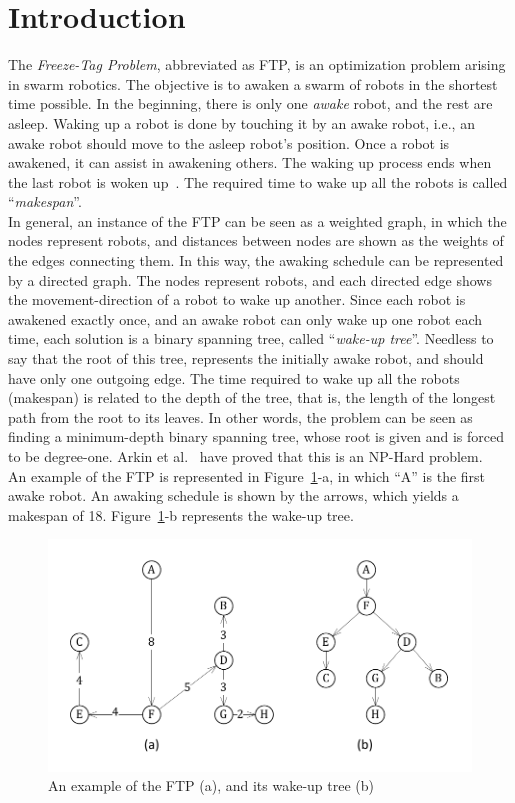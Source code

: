 \documentclass[review]{elsarticle}
\begin{document}
\section{Introduction}
The \textit{Freeze-Tag Problem}, abbreviated as FTP, is an optimization problem arising in swarm robotics. The objective is to awaken a swarm of robots in the shortest time possible. In the beginning, there is only one \textit{awake} robot, and the rest are asleep. Waking up a robot is done by touching it by an awake robot, i.e., an awake robot should move to the asleep robot's position. Once a robot is awakened, it can assist in awakening others. The waking up process ends when the last robot is woken up~\cite{Arkin2006}. The required time to wake up all the robots is called ``\textit{makespan}''.\\
In general, an instance of the FTP can be seen as a weighted graph, in which the nodes represent robots, and distances between nodes are shown as the weights of the edges connecting them. In this way, the awaking schedule can be represented by a directed graph. The nodes represent robots, and each directed edge shows the movement-direction of a robot to wake up another. Since each robot is awakened exactly once, and an awake robot can only wake up one robot each time, each solution is a binary spanning tree, called ``\textit{wake-up tree}''. Needless to say that the root of this tree, represents the initially awake robot, and should have only one outgoing edge. The time required to wake up all the robots (makespan) is related to the depth of the tree, that is, the length of the longest path from the root to its leaves. In other words, the problem can be seen as finding a minimum-depth binary spanning tree, whose root is given and is forced to be degree-one. Arkin et al.~\cite{Arkin2006} have proved that this is an NP-Hard problem.\\
An example of the FTP is represented in Figure~\ref{fig:example}-a, in which ``A'' is the first awake robot. An awaking schedule is shown by the arrows, which yields a makespan of 18. Figure~\ref{fig:example}-b represents the wake-up tree.
\begin{figure}[h]
  \vspace{-10pt}
  \centering
  \includegraphics[scale=.7]{Figs/fig1.pdf}
  \vspace{-20pt}
  \caption{An example of the FTP (a), and its wake-up tree (b)}
  \label{fig:example}
\end{figure}
\end{document}

